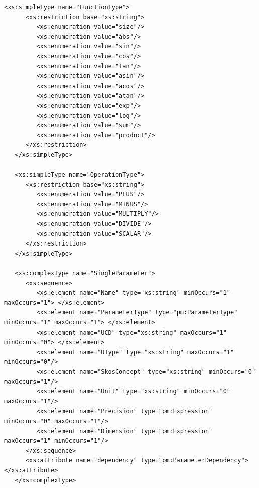 \documentclass[a4paper,11pt] {ivoa}
\begin{document}
\begin{lstlisting}[style=listXML]
   <xs:simpleType name="FunctionType">
      <xs:restriction base="xs:string">
         <xs:enumeration value="size"/>
         <xs:enumeration value="abs"/>
         <xs:enumeration value="sin"/>
         <xs:enumeration value="cos"/>
         <xs:enumeration value="tan"/>
         <xs:enumeration value="asin"/>
         <xs:enumeration value="acos"/>
         <xs:enumeration value="atan"/>
         <xs:enumeration value="exp"/>
         <xs:enumeration value="log"/>
         <xs:enumeration value="sum"/>
         <xs:enumeration value="product"/>
      </xs:restriction>
   </xs:simpleType>

   <xs:simpleType name="OperationType">
      <xs:restriction base="xs:string">
         <xs:enumeration value="PLUS"/>
         <xs:enumeration value="MINUS"/>
         <xs:enumeration value="MULTIPLY"/>
         <xs:enumeration value="DIVIDE"/>
         <xs:enumeration value="SCALAR"/>
      </xs:restriction>
   </xs:simpleType>

   <xs:complexType name="SingleParameter">
      <xs:sequence>
         <xs:element name="Name" type="xs:string" minOccurs="1" maxOccurs="1"> </xs:element>
         <xs:element name="ParameterType" type="pm:ParameterType" minOccurs="1" maxOccurs="1"> </xs:element>
         <xs:element name="UCD" type="xs:string" maxOccurs="1" minOccurs="0"> </xs:element>
         <xs:element name="UType" type="xs:string" maxOccurs="1" minOccurs="0"/>
         <xs:element name="SkosConcept" type="xs:string" minOccurs="0" maxOccurs="1"/>
         <xs:element name="Unit" type="xs:string" minOccurs="0" maxOccurs="1"/>
         <xs:element name="Precision" type="pm:Expression" minOccurs="0" maxOccurs="1"/>
         <xs:element name="Dimension" type="pm:Expression" maxOccurs="1" minOccurs="1"/>
      </xs:sequence>
      <xs:attribute name="dependency" type="pm:ParameterDependency"> </xs:attribute>
   </xs:complexType>


\end{lstlisting}
\end{document}
